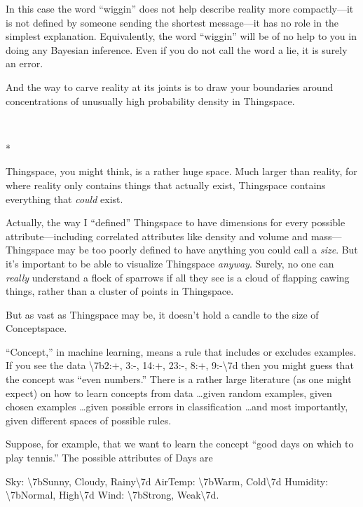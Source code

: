 {
 In this case the word
``wiggin'' does not help describe
reality more compactly---it is not defined by someone sending the
shortest message---it has no role in the simplest explanation.
Equivalently, the word ``wiggin''
will be of no help to you in doing any Bayesian inference. Even if you
do not call the word a lie, it is surely an error.}

{
 And the way to carve reality at its joints is to draw your
boundaries around concentrations of unusually high probability density
in Thingspace.}

{\centering
 \ ~
\par}

{\centering
 *
\par}


{
 Thingspace, you might think, is a rather huge space. Much larger
than reality, for where reality only contains things that actually
exist, Thingspace contains everything that \textit{could} exist. }

{
 Actually, the way I ``defined''
Thingspace to have dimensions for every possible attribute---including
correlated attributes like density and volume and mass---Thingspace may
be too poorly defined to have anything you could call a \textit{size}.
But it's important to be able to visualize Thingspace
\textit{anyway}. Surely, no one can \textit{really} understand a flock
of sparrows if all they see is a cloud of flapping cawing things,
rather than a cluster of points in Thingspace.}

{
 But as vast as Thingspace may be, it doesn't hold
a candle to the size of Conceptspace.}

{
 ``Concept,'' in machine
learning, means a rule that includes or excludes examples. If you see
the data {\textbackslash}{\textquotesingle}7b2:+, 3:-, 14:+, 23:-, 8:+,
9:-{\textbackslash}{\textquotesingle}7d then you might guess that the
concept was ``even numbers.'' There
is a rather large literature (as one might expect) on how to learn
concepts from data \ldots given random examples, given chosen examples
\ldots given possible errors in classification \ldots and most
importantly, given different spaces of possible rules.}

{
 Suppose, for example, that we want to learn the concept
``good days on which to play
tennis.'' The possible attributes of Days are}

{\centering
 Sky: {\textbackslash}{\textquotesingle}7bSunny, Cloudy,
Rainy{\textbackslash}{\textquotesingle}7d\newline
 AirTemp: {\textbackslash}{\textquotesingle}7bWarm,
Cold{\textbackslash}{\textquotesingle}7d\newline
 Humidity: {\textbackslash}{\textquotesingle}7bNormal,
High{\textbackslash}{\textquotesingle}7d\newline
 Wind: {\textbackslash}{\textquotesingle}7bStrong,
Weak{\textbackslash}{\textquotesingle}7d.
\par}


